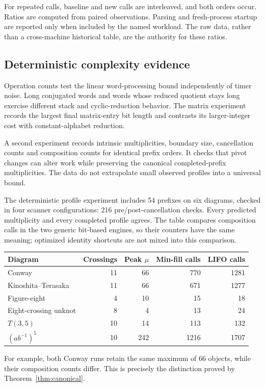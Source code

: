 \documentclass[11pt,letterpaper]{article}
\theoremstyle{definition}
\begin{document}

For repeated calls, baseline and new calls are interleaved, and both
orders occur. Ratios are computed from paired observations.
Parsing and fresh-process startup are reported only when included by
the named workload. The raw data, rather than a cross-machine historical
table, are the authority for these ratios.

\subsection{Deterministic complexity evidence}

Operation counts test the linear word-processing bound independently of
timer noise. Long conjugated words and words whose reduced quotient
stays long exercise different stack and cyclic-reduction behavior.
The matrix experiment records the largest final matrix-entry bit length and contrasts
its larger-integer cost with constant-alphabet reduction.

A second experiment records intrinsic multiplicities, boundary size,
cancellation counts and composition counts for identical prefix orders.
It checks that pivot changes can alter work while preserving the
canonical completed-prefix multiplicities. The data do not extrapolate
small observed profiles into a universal bound.

The deterministic profile experiment includes 54 prefixes on six diagrams,
checked in four scanner configurations: 216 pre/post-cancellation checks.
Every predicted multiplicity and every completed profile agrees.
The table compares composition calls in the two generic bit-based engines,
so their counters have the same meaning; optimized identity shortcuts are
not mixed into this comparison.

\begin{center}
\small
\begin{tabular}{@{}lrrrr@{}}
\toprule
Diagram & Crossings & Peak \(\mu\) & Min-fill calls & LIFO calls\\
\midrule
Conway & 11 & 66 & 770 & 1281 \\
Kinoshita--Terasaka & 11 & 66 & 671 & 1277 \\
Figure-eight & 4 & 10 & 15 & 18 \\
Eight-crossing unknot & 8 & 4 & 13 & 24 \\
\(T(3,5)\) & 10 & 14 & 113 & 132 \\
\((ab^{-1})^5\) & 10 & 242 & 1216 & 1707 \\
\bottomrule
\end{tabular}
\end{center}
For example, both Conway runs retain the same maximum of 66 objects,
while their composition counts differ. This is precisely the distinction
proved by Theorem~\ref{thm:canonical}.
\end{document}
